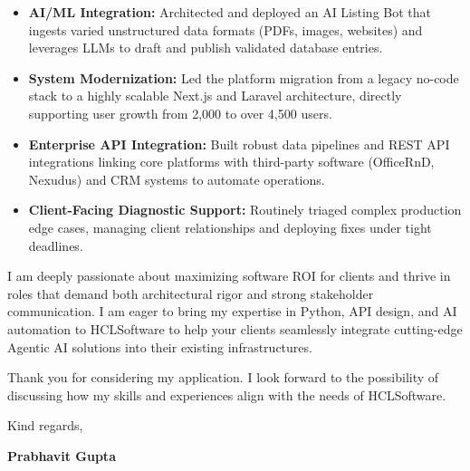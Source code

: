 \documentclass[11pt,a4paper]{article}
\begin{document}
\begin{itemize}
    \item \textbf{AI/ML Integration:} Architected and deployed an AI Listing Bot that ingests varied unstructured data formats (PDFs, images, websites) and leverages LLMs to draft and publish validated database entries.
    \item \textbf{System Modernization:} Led the platform migration from a legacy no-code stack to a highly scalable Next.js and Laravel architecture, directly supporting user growth from 2,000 to over 4,500 users.
    \item \textbf{Enterprise API Integration:} Built robust data pipelines and REST API integrations linking core platforms with third-party software (OfficeRnD, Nexudus) and CRM systems to automate operations.
    \item \textbf{Client-Facing Diagnostic Support:} Routinely triaged complex production edge cases, managing client relationships and deploying fixes under tight deadlines.
\end{itemize}

\vspace{10pt}

\noindent I am deeply passionate about maximizing software ROI for clients and thrive in roles that demand both architectural rigor and strong stakeholder communication. I am eager to bring my expertise in Python, API design, and AI automation to HCLSoftware to help your clients seamlessly integrate cutting-edge Agentic AI solutions into their existing infrastructures.

\vspace{10pt}

\noindent Thank you for considering my application. I look forward to the possibility of discussing how my skills and experiences align with the needs of HCLSoftware.

\vspace{15pt}

\noindent Kind regards,

\vspace{15pt}

\noindent \textbf{Prabhavit Gupta}
\end{document}

